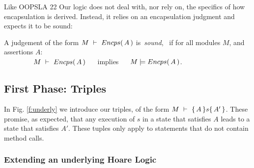 Like OOPSLA 22 Our logic does not {deal with, nor} rely on, the specifics of  how   encapsulation
{is derived}.
{Instead, it relies} on an encapsulation judgment and expects it to be sound:

\begin{definition}
\label{lem:encap-soundness}
A judgement of the form $M\ \vdash\ {Encps(\, A\, )}$  is\  \emph{sound}, \ if 
for all modules $M$, and assertions $A$:\\

$\strut \hspace{1.5cm} M\ \vdash\ {Encps(\, A\, )} \ \ \ \ $ implies $\ \ \ \ \satisfies{M}{\encaps{A}}$.
\end{definition}

\subsection{First Phase: Triples}

In  Fig. \ref{f:underly} we introduce our triples, of the form ${   M\ \vdash\ \{\,A\, \} s \{\,A'\, \}}$. 
These promise, as expected, that any execution of $s$ in a state that satisfies $A$ leads to a state that satisfies $A'$.
These tuples only apply to statements that do not contain method calls.

 
\subsubsection{Extending an underlying Hoare Logic}


